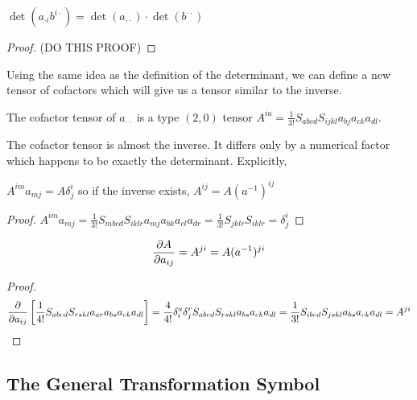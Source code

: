 \documentclass[11pt, a4paper]{article}
\begin{document}
\begin{theorem}
$\det{(a_{\cdot i} b^{i \cdot})} = \det{(a_{\cdot \cdot})} \cdot \det{(b^{\cdot \cdot})}$
\end{theorem}

\begin{proof}
(DO THIS PROOF)
\end{proof}

Using the same idea as the definition of the determinant, we can define a new tensor of cofactors which will give us a tensor similar to the inverse. 

\begin{definition}
The cofactor tensor of $a_{\cdot \cdot}$ is a type $(2,0)$ tensor $A^{ia} = \frac{1}{3!} S_{abcd} S_{ijkl} a_{bj} a_{ck} a_{dl}$. 
\end{definition}
The cofactor tensor is almost the inverse. It differs only by a numerical factor which happens to be exactly the determinant. Explicitly,
\begin{theorem}
$A^{im} a_{mj} = A \delta^i_j$ so if the inverse exists, $A^{ij} = A (a^{-1})^{ij}$
\end{theorem}

\begin{proof}
$A^{im} a_{mj} = \frac{1}{3!} S_{mbcd} S_{iklr} a_{mj} a_{bk} a_{cl} a_{dr} = \frac{1}{3!} S_{jklr} S_{iklr} = \delta^i_j$
\end{proof}

\begin{theorem}
\[\frac{\partial{A}}{\partial{a_{ij}}} = A^{ji} = A(a^{-1})^{ji}\]
\end{theorem}

\begin{proof}
\[\frac{\partial{}}{\partial{a_{ij}}} \left[ \frac{1}{4!} S_{abcd} S_{rskl} a_{ar} a_{bs} a_{ck} a_{dl} \right] = \frac{4}{4!} \delta^a_i \delta^r_j S_{abcd} S_{rskl} a_{bs} a_{ck} a_{dl} = \frac{1}{3!} S_{ibcd} S_{jskl} a_{bs} a_{ck} a_{dl} = A^{ji} \]
\end{proof}


\subsection{The General Transformation Symbol}
\end{document}
